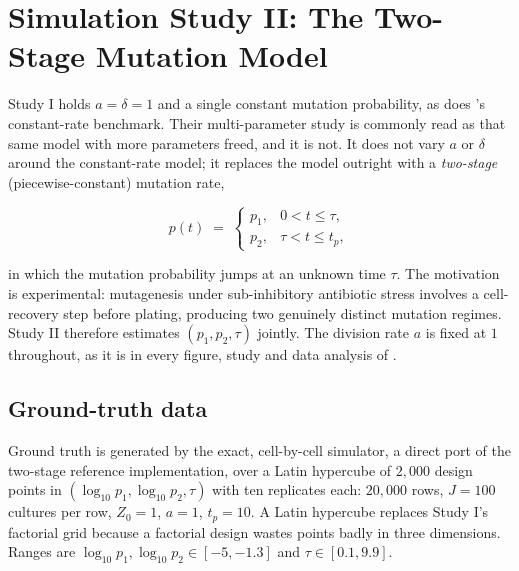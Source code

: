 \documentclass[sn-basic,iicol,pdflatex]{sn-jnl}
\begin{document}
\section{Simulation Study II: The Two-Stage Mutation Model}
\label{sec:sim3D}

Study I holds $a=\delta=1$ and a single constant mutation probability, as does
\citet{lu2023}'s constant-rate benchmark. Their multi-parameter study is
commonly read as that same model with more parameters freed, and it is not.
It does not vary $a$ or $\delta$ around the constant-rate model; it replaces the
model outright with a \emph{two-stage} (piecewise-constant) mutation rate,

\begin{equation}
p(t) \;=\;
\begin{cases}
p_1, & 0 < t \le \tau,\\[2pt]
p_2, & \tau < t \le t_p,
\end{cases}
\label{eq:twostage}
\end{equation}

in which the mutation probability jumps at an unknown time $\tau$. The
motivation is experimental: mutagenesis under sub-inhibitory antibiotic stress
involves a cell-recovery step before plating, producing two genuinely distinct
mutation regimes. Study II therefore estimates $(p_1, p_2, \tau)$ jointly. The
division rate $a$ is fixed at $1$ throughout, as it is in every figure, study
and data analysis of \citeauthor{lu2023}.

\subsection{Ground-truth data}
\label{sec:groundtruth3D}

Ground truth is generated by the exact, cell-by-cell simulator, a direct port of
the two-stage reference implementation, over a Latin hypercube of $2{,}000$
design points in $(\log_{10}p_1, \log_{10}p_2, \tau)$ with ten replicates each:
$20{,}000$ rows, $J=100$ cultures per row, $Z_0 = 1$, $a = 1$, $t_p = 10$. A
Latin hypercube replaces Study I's factorial grid because a factorial design
wastes points badly in three dimensions. Ranges are
$\log_{10}p_1, \log_{10}p_2 \in [-5,-1.3]$ and $\tau \in [0.1, 9.9]$.
\end{document}
